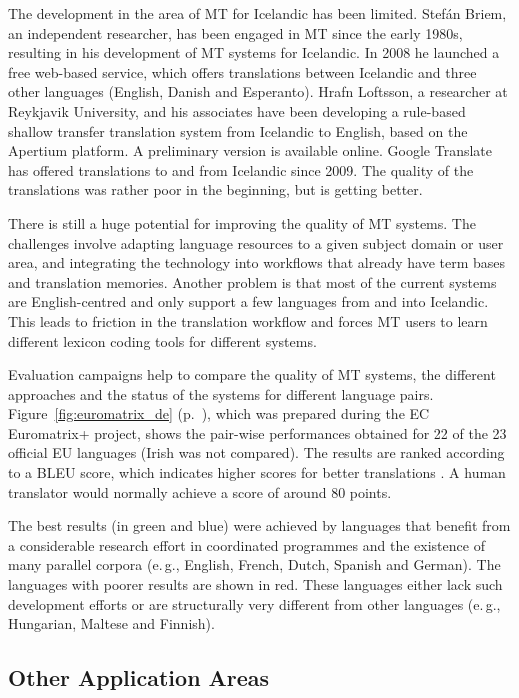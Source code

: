 \documentclass{../../metanetpaper}
\begin{document}
\begin{multicols}{2}
The development in the area of MT for Icelandic has been limited. Stefán Briem, an independent researcher, has been engaged in MT since the early 1980s, resulting in his development of MT systems for Icelandic. In 2008 he launched a free web-based service, which offers translations between Icelandic and three other languages (English, Danish and Esperanto)\cite{tut1}. Hrafn Loftsson, a researcher at Reykjavik University, and his associates have been developing a rule-based shallow transfer translation system from Icelandic to English, based on the Apertium platform.\cite{ape1} A preliminary version is available online\cite{ape2}.  Google Translate has offered translations to and from Icelandic since 2009. The quality of the translations was rather poor in the beginning, but is getting better.

There is still a huge potential for improving the quality of MT systems. The challenges involve adapting language resources to a given subject domain or user area, and integrating the technology into workflows that already have term bases and translation memories. Another problem is that most of the current systems are English-centred and only support a few languages from and into Icelandic. This leads to friction in the translation workflow and forces MT users to learn different lexicon coding tools for different systems.

Evaluation campaigns help to compare the quality of MT systems, the different approaches and the status of the systems for different language pairs. Figure~\ref{fig:euromatrix_de} (p.~\pageref{fig:euromatrix_de}), which was prepared during the EC Euromatrix+ project, shows the pair-wise performances obtained for 22 of the 23 official EU languages (Irish was not compared). The results are ranked according to a BLEU score, which indicates higher scores for better translations \cite{bleu1}. A human translator would normally achieve a score of around 80 points.

The best results (in green and blue) were achieved by languages that benefit from a considerable research effort in coordinated programmes and the existence of many parallel corpora (e.\,g., English, French, Dutch, Spanish and German). The languages with poorer results are shown in red. These languages either lack such development efforts or are structurally very different from other languages (e.\,g., Hungarian, Maltese and Finnish).

\subsection{Other Application Areas}


\end{multicols}
\end{document}
